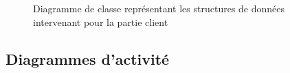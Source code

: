 \documentclass[a4paper]{report}
\begin{document}
\begin{figure}[H]
    \vspace*{-3cm}
    \caption{\label{3} Diagramme de classe représentant les structures de données intervenant pour la partie client}
\end{figure}

\subsection{Diagrammes d'activité}
\end{document}
